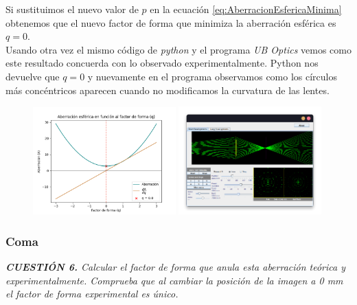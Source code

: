 \documentclass[11pt]{article}
\begin{document}
            \clearpage
            Si sustituimos el nuevo valor de $p$ en la ecuación \ref{eq:AberracionEsfericaMinima} obtenemos que el nuevo factor de forma que minimiza la aberración esférica es $q=0$.\\
            
            Usando otra vez el mismo código de \textit{python} y el programa \textit{UB Optics} vemos como este resultado concuerda con lo observado experimentalmente. Python nos devuelve que $q=0$ y nuevamente en el programa observamos como los círculos más concéntricos aparecen cuando no modificamos la curvatura de las lentes.
            
            \begin{figure}[ht]
                \centering
                \includegraphics[width=0.49\textwidth]{fotos/parte 1/Aberraciones/Aberración Esférica/factor_de_forma_2f.png}
                \includegraphics[width=0.49\textwidth]{fotos/parte 1/Aberraciones/Aberración Esférica/AbEsf_2f.png}
            \end{figure}

        \vspace{-0.5cm}
        \subsubsection{Coma}
        \textit{\textbf{CUESTIÓN 6.} Calcular el factor de forma que anula esta aberración teórica y experimentalmente. Comprueba que al cambiar la posición de la imagen a 0 mm el factor de forma experimental es único.} \\
        
\end{document}
